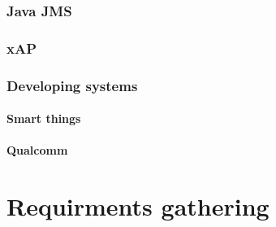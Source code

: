 \documentclass{l4proj}
\begin{document}
\subsection{Java JMS} %
\label{sub:java_jms}


\subsection{xAP} %
\label{sub:xap}
\cite{xAP}

\subsection{Developing systems} %
\label{sub:developing_systems}

\subsubsection{Smart things} %
\label{ssub:smart_things}


\subsubsection{Qualcomm} %
\label{ssub:qualcomm}







\chapter{Requirments gathering} %
\label{cha:requirments_gathering}




\end{document}
